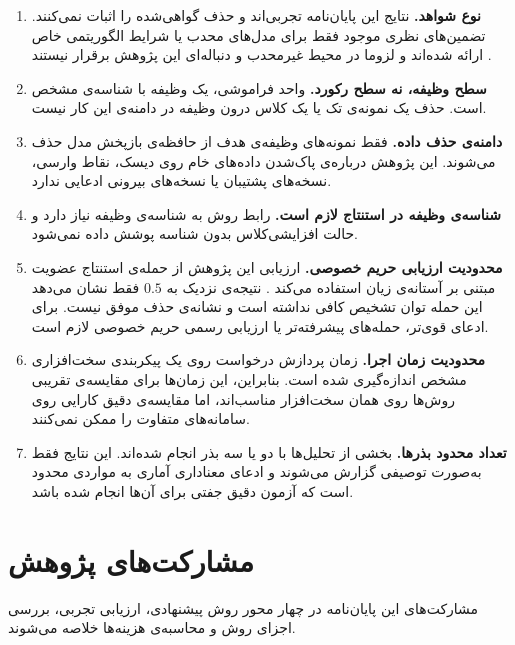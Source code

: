 \begin{enumerate}
	\item \textbf{نوع شواهد.} نتایج این پایان‌نامه تجربی‌اند و {حذف گواهی‌شده} را اثبات نمی‌کنند. تضمین‌های نظری موجود فقط برای مدل‌های محدب یا شرایط الگوریتمی خاص ارائه شده‌اند و لزوما در محیط غیرمحدب و دنباله‌ای این پژوهش برقرار نیستند \cite{guo2020certified,neel2021descent,sekhari2021remember}.
	\item \textbf{سطح وظیفه، نه سطح رکورد.} واحد فراموشی، یک وظیفه با شناسه‌ی مشخص است. حذف یک نمونه‌ی تک یا یک کلاس درون وظیفه در دامنه‌ی این کار نیست.
	\item \textbf{دامنه‌ی حذف داده.} فقط نمونه‌های وظیفه‌ی هدف از حافظه‌ی بازپخش مدل حذف می‌شوند. این پژوهش درباره‌ی پاک‌شدن داده‌های خام روی دیسک، نقاط وارسی، نسخه‌های پشتیبان یا نسخه‌های بیرونی ادعایی ندارد.
	\item \textbf{شناسه‌ی وظیفه در استنتاج لازم است.} رابط روش به شناسه‌ی وظیفه نیاز دارد و حالت {افزایشی‌کلاس} بدون شناسه پوشش داده نمی‌شود.
	\item \textbf{محدودیت ارزیابی حریم خصوصی.} ارزیابی این پژوهش از {حمله‌ی استنتاج عضویت} مبتنی بر آستانه‌ی زیان استفاده می‌کند \cite{shokri2017membership}. نتیجه‌ی نزدیک به $0.5$ فقط نشان می‌دهد این حمله توان تشخیص کافی نداشته است و نشانه‌ی حذف موفق نیست. برای ادعای قوی‌تر، حمله‌های پیشرفته‌تر \cite{carlini2022membership} یا {ارزیابی رسمی حریم خصوصی} \cite{steinke2023privacy} لازم است.
	\item \textbf{محدودیت زمان اجرا.} زمان پردازش درخواست روی یک پیکربندی سخت‌افزاری مشخص اندازه‌گیری شده است. بنابراین، این زمان‌ها برای مقایسه‌ی تقریبی روش‌ها روی همان سخت‌افزار مناسب‌اند، اما مقایسه‌ی دقیق کارایی روی سامانه‌های متفاوت را ممکن نمی‌کنند.
	\item \textbf{تعداد محدود بذرها.} بخشی از تحلیل‌ها با دو یا سه بذر انجام شده‌اند. این نتایج فقط به‌صورت توصیفی گزارش می‌شوند و ادعای معناداری آماری به مواردی محدود است که آزمون دقیق جفتی برای آن‌ها انجام شده باشد.
\end{enumerate}

\section{مشارکت‌های پژوهش}
\label{sec:intro-contributions}

مشارکت‌های این پایان‌نامه در چهار محور روش پیشنهادی، ارزیابی تجربی، بررسی اجزای روش و محاسبه‌ی هزینه‌ها خلاصه می‌شوند.

